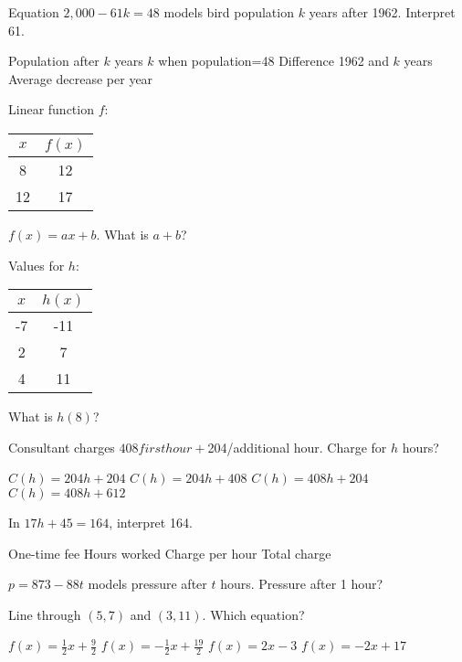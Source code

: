 \documentclass[12pt]{exam}
\begin{document}
\begin{questions}
\question Equation $2,000 - 61k = 48$ models bird population $k$ years after 1962. Interpret 61.
\begin{choices}
\choice Population after $k$ years
\choice $k$ when population=48
\choice Difference 1962 and $k$ years
\choice Average decrease per year
\end{choices}

\question Linear function $f$:
\begin{center}
\begin{tabular}{|c|c|}
\hline
$x$ & $f(x)$ \\
\hline
8 & 12 \\
12 & 17 \\
\hline
\end{tabular}
\end{center}
$f(x) = ax + b$. What is $a + b$?

\question Values for $h$:
\begin{center}
\begin{tabular}{|c|c|}
\hline
$x$ & $h(x)$ \\
\hline
-7 & -11 \\
2 & 7 \\
4 & 11 \\
\hline
\end{tabular}
\end{center}
What is $h(8)$?
\begin{choices}
\end{choices}

\question Consultant charges $408 first hour + $204/additional hour. Charge for $h$ hours?
\begin{choices}
\choice $C(h) = 204h + 204$
\choice $C(h) = 204h + 408$
\choice $C(h) = 408h + 204$
\choice $C(h) = 408h + 612$
\end{choices}

\question In $17h + 45 = 164$, interpret 164.
\begin{choices}
\choice One-time fee
\choice Hours worked
\choice Charge per hour
\choice Total charge
\end{choices}

\question $p = 873 - 88t$ models pressure after $t$ hours. Pressure after 1 hour?
\begin{choices}
\end{choices}

\question Line through $(5,7)$ and $(3,11)$. Which equation?
\begin{choices}
\choice $f(x) = \frac{1}{2}x + \frac{9}{2}$
\choice $f(x) = -\frac{1}{2}x + \frac{19}{2}$
\choice $f(x) = 2x - 3$
\choice $f(x) = -2x + 17$
\end{choices}


\end{questions}
\end{document}
